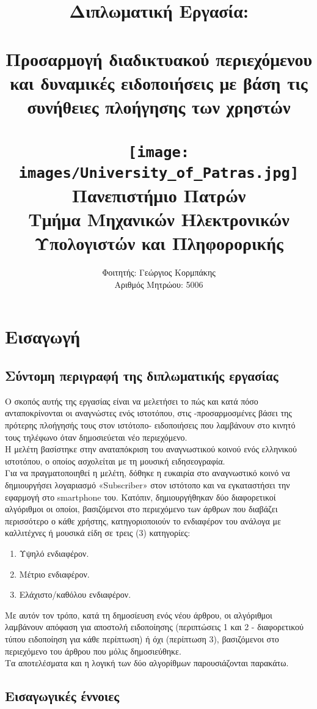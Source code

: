 \documentclass{article}
\title{
    {\huge Διπλωματική Εργασία:\\~\\
    \Large	Προσαρμογή διαδικτυακού περιεχόμενου και δυναμικές ειδοποιήσεις με βάση τις συνήθειες πλοήγησης των χρηστών}
    \\~\\
    \texttt{[image: images/University\_of\_Patras.jpg]}\\
    {Πανεπιστήμιο Πατρών}\\
    {Τμήμα Μηχανικών Ηλεκτρονικών Υπολογιστών και Πληφορορικής}
}
\author{Φοιτητής: Γεώργιος Κορμπάκης\\
        Αριθμός Μητρώου: 5006}
\begin{document}
\clearpage\maketitle
\thispagestyle{empty}

\newpage
\setcounter{page}{1}


\section{Εισαγωγή}
\subsection{Σύντομη περιγραφή της διπλωματικής εργασίας}
Ο σκοπός αυτής της εργασίας είναι να μελετήσει το πώς και κατά πόσο ανταποκρίνονται οι αναγνώστες ενός ιστοτόπου, στις -προσαρμοσμένες βάσει της πρότερης πλοήγησής τους στον ιστότοπο- ειδοποιήσεις που λαμβάνουν στο κινητό τους τηλέφωνο όταν δημοσιεύεται νέο περιεχόμενο. \\

Η μελέτη βασίστηκε στην αναταπόκριση του αναγνωστικού κοινού ενός ελληνικού ιστοτόπου, ο οποίος ασχολείται με τη μουσική ειδησεογραφία. \\

Για να πραγματοποιηθεί η μελέτη, δόθηκε η ευκαιρία στο αναγνωστικό κοινό να δημιουργήσει λογαριασμό «Subscriber» στον ιστότοπο και να εγκαταστήσει την εφαρμογή στο smartphone του. Κατόπιν, δημιουργήθηκαν δύο διαφορετικοί αλγόριθμοι οι οποίοι, βασιζόμενοι στο περιεχόμενο των άρθρων που διαβάζει περισσότερο ο κάθε χρήστης, κατηγοριοποιούν το ενδιαφέρον του ανάλογα με καλλιτέχνες ή μουσικά είδη σε τρεις (3) κατηγορίες:
\begin{enumerate}
  \item Υψηλό ενδιαφέρον.
  \item Μέτριο ενδιαφέρον.
  \item Ελάχιστο/καθόλου ενδιαφέρον.
\end{enumerate}
Με αυτόν τον τρόπο, κατά τη δημοσίευση ενός νέου άρθρου, οι αλγόριθμοι λαμβάνουν απόφαση για αποστολή ειδοποίησης (περιπτώσεις 1 και 2 - διαφορετικού τύπου ειδοποίηση για κάθε περίπτωση) ή όχι (περίπτωση 3), βασιζόμενοι στο περιεχόμενο του άρθρου που μόλις δημοσιεύθηκε. \\
Τα αποτελέσματα και η λογική των δύο αλγορίθμων παρουσιάζονται παρακάτω.

\subsection{Εισαγωγικές έννοιες}
\end{document}
